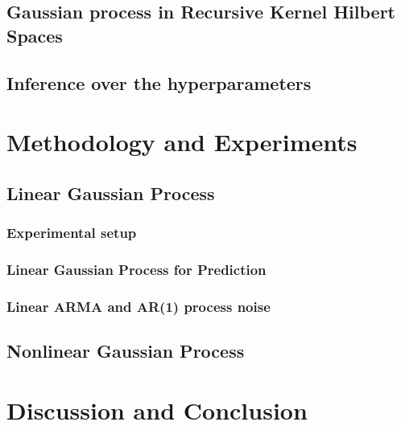 \documentclass[11pt, twoside]{article}   	%
\begin{document}
\subsection{Gaussian process in Recursive Kernel Hilbert Spaces}
\subsection{Inference over the hyperparameters}

\section{Methodology and Experiments}
\subsection{Linear Gaussian Process}
\subsubsection{Experimental setup}
\subsubsection{Linear Gaussian Process for Prediction}
\subsubsection{Linear ARMA and AR(1) process noise}
\subsection{Nonlinear Gaussian Process}

\section{Discussion and Conclusion}



\end{document}
